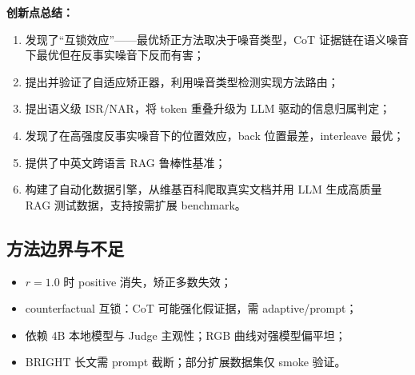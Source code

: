 \documentclass[UTF8,zihao=-4]{ctexart}
\begin{document}
\textbf{创新点总结：}
\begin{enumerate}
  \item 发现了“互锁效应”——最优矫正方法取决于噪音类型，CoT 证据链在语义噪音下最优但在反事实噪音下反而有害；
  \item 提出并验证了自适应矫正器，利用噪音类型检测实现方法路由；
  \item 提出语义级 ISR/NAR，将 token 重叠升级为 LLM 驱动的信息归属判定；
  \item 发现了在高强度反事实噪音下的位置效应，back 位置最差，interleave 最优；
  \item 提供了中英文跨语言 RAG 鲁棒性基准；
  \item 构建了自动化数据引擎，从维基百科爬取真实文档并用 LLM 生成高质量 RAG 测试数据，支持按需扩展 benchmark。
\end{enumerate}



\subsection{方法边界与不足}
\begin{itemize}
  \item $r=1.0$ 时 positive 消失，矫正多数失效；
  \item counterfactual 互锁：CoT 可能强化假证据，需 adaptive/prompt；
  \item 依赖 4B 本地模型与 Judge 主观性；RGB 曲线对强模型偏平坦；
  \item BRIGHT 长文需 prompt 截断；部分扩展数据集仅 smoke 验证。
\end{itemize}
\end{document}
